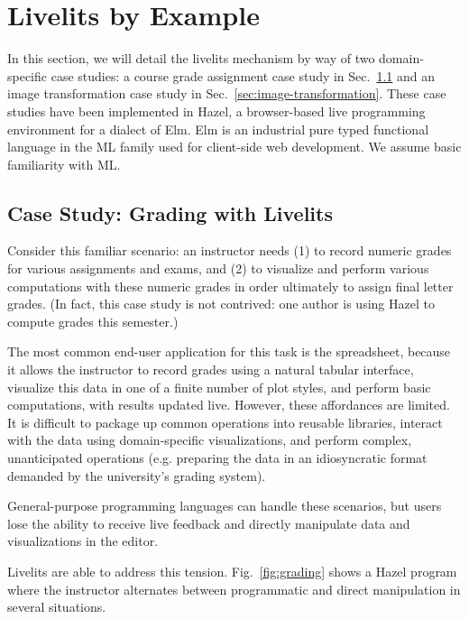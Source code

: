 \section{Livelits by Example}\label{sec:case-studies}


In this section, we will detail the livelits mechanism by way of
two domain-specific case studies:
a course grade assignment case study in Sec.~\ref{sec:live-grading}
and an image transformation case study in Sec.~\ref{sec:image-transformation}.
These case studies have been implemented
in Hazel, a browser-based live programming environment for a dialect of Elm.
Elm is an industrial pure typed functional language in the
ML family used for client-side web development.
We assume basic familiarity with ML.

\subsection{Case Study: Grading with Livelits}\label{sec:live-grading}
Consider this familiar scenario: an instructor needs
(1) to record numeric grades for various assignments and exams, and
(2) to visualize and perform various computations with these numeric grades
in order ultimately to assign final letter grades.
(In fact, this case study is not contrived: one author is using Hazel to compute grades this semester.)

The most common end-user application for this task is the spreadsheet, because
it allows the instructor to record grades using a natural tabular interface,
visualize this data in one of a finite number of plot styles,
and perform basic computations,
with results updated live.
However, these affordances are limited.
It is difficult to package up common operations
into reusable libraries, interact with the data using domain-specific visualizations,
and perform complex, unanticipated operations
(e.g. preparing the data in an idiosyncratic format demanded by the university's grading system).

General-purpose programming languages
can handle these scenarios, but users
lose the ability to receive live feedback and
directly manipulate data and visualizations in the editor.

Livelits are able to address this tension.
Fig.~\ref{fig:grading} shows a Hazel program where
the instructor alternates between programmatic and direct manipulation in several situations.

